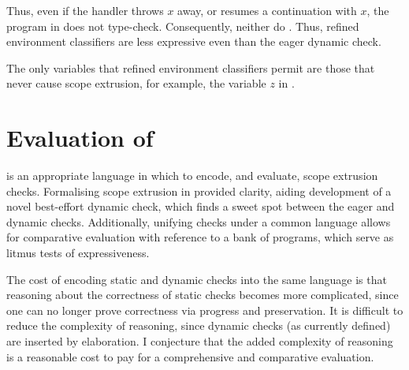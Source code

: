 Thus, even if the handler throws $x$ away, or resumes a continuation with $x$, the program in  does not type-check. Consequently, neither do . Thus, refined environment classifiers are less expressive even than the eager dynamic check. 


The only variables that refined environment classifiers permit are those that never cause scope extrusion, for example, the variable $z$ in .



\section{Evaluation of \texorpdfstring{\sourceLang{}}{Lambda-Op-Quote-Splice}} \label{section:evaluation}
\sourceLang{} is an appropriate language in which to encode, and evaluate, scope extrusion checks. Formalising scope extrusion in \sourceLang{} provided clarity, aiding development of a novel best-effort dynamic check, which finds a sweet spot between the eager and dynamic checks. Additionally, unifying checks under a common language allows for comparative evaluation with reference to a bank of \sourceLang{} programs, which serve as litmus tests of expressiveness.

The cost of encoding static and dynamic checks into the same language is that reasoning about the correctness of static checks becomes more complicated, since one can no longer prove correctness via progress and preservation. It is difficult to reduce the complexity of reasoning, since dynamic checks (as currently defined) are inserted by elaboration. I conjecture that the added complexity of reasoning is a reasonable cost to pay for a comprehensive and comparative evaluation.


